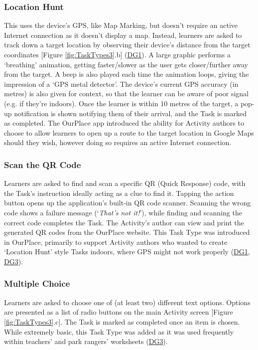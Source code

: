 \subsubsection*{Location Hunt}
This uses the device's GPS, like Map Marking, but doesn't require an active Internet connection as it doesn't display a map. Instead, learners are asked to track down a target location by observing their device's distance from the target coordinates [Figure \ref{fig:TaskTypes3}.b] (\hyperref[DG1]{DG1}). A large graphic performs a `breathing' animation, getting faster/slower as the user gets closer/further away from the target. A beep is also played each time the animation loops, giving the impression of a `GPS metal detector'. The device's current GPS accuracy (in metres) is also given for context, so that the learner can be aware of poor signal (e.g. if they're indoors). Once the learner is within 10 metres of the target, a pop-up notification is shown notifying them of their arrival, and the Task is marked as completed. The OurPlace app introduced the ability for Activity authors to choose to allow learners to open up a route to the target location in Google Maps should they wish, however doing so requires an active Internet connection.

\subsubsection*{Scan the QR Code}
Learners are asked to find and scan a specific QR (Quick Response) code, with the Task's instruction ideally acting as a clue to find it. Tapping the action button opens up the application's built-in QR code scanner. Scanning the wrong code shows a failure message (`\textit{That's not it!}'), while finding and scanning the correct code completes the Task. The Activity's author can view and print the generated QR codes from the OurPlace website. This Task Type was introduced in OurPlace, primarily to support Activity authors who wanted to create `Location Hunt' style Tasks indoors, where GPS might not work properly (\hyperref[DG1]{DG1}, \hyperref[DG3]{DG3}).

\subsubsection*{Multiple Choice}
Learners are asked to choose one of (at least two) different text options. Options are presented as a list of radio buttons on the main Activity screen [Figure \ref{fig:TaskTypes3}.c]. The Task is marked as completed once an item is chosen. While extremely basic, this Task Type was added as it was used frequently within teachers' and park rangers' worksheets (\hyperref[DG3]{DG3}).

